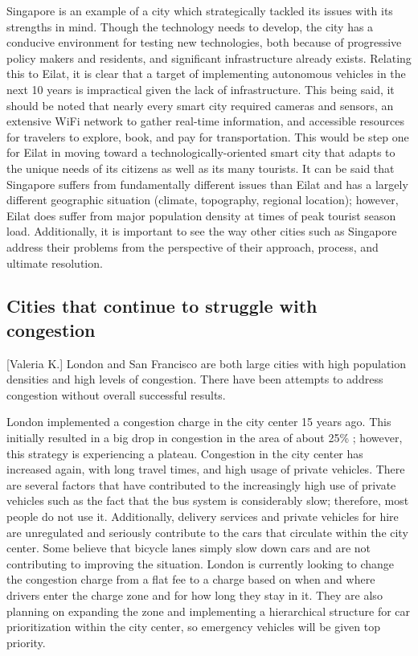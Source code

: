 \documentclass[12pt]{article}                       %
\begin{document}
Singapore is an example of a city which strategically tackled its issues with its strengths in mind. Though the technology needs to develop, the city has a conducive environment for testing new technologies, both because of progressive policy makers and residents, and significant infrastructure already exists. Relating this to Eilat, it is clear that a target of implementing autonomous vehicles in the next 10 years is impractical given the lack of infrastructure. This being said, it should be noted that nearly every smart city required cameras and sensors, an extensive WiFi network to gather real-time information, and accessible resources for travelers to explore, book, and pay for transportation. This would be step one for Eilat in moving toward a technologically-oriented smart city that adapts to the unique needs of its citizens as well as its many tourists. It can be said that Singapore suffers from fundamentally different issues than Eilat and has a largely different geographic situation (climate, topography, regional location); however, Eilat does suffer from major population density at times of peak tourist season load. Additionally, it is important to see the way other cities such as Singapore address their problems from the perspective of their approach, process, and ultimate resolution.

\subsection{Cities that continue to struggle with congestion}[Valeria K.]
London and San Francisco are both large cities with high population densities and high levels of congestion. There have been attempts to address congestion without overall successful results. 

London implemented a congestion charge in the city center 15 years ago. This initially resulted in a big drop in congestion in the area of about 25\% \cite{Badstuber2018LondonIt}; however, this strategy is experiencing a plateau. Congestion in the city center has increased again, with long travel times, and high usage of private vehicles. There are several factors that have contributed to the increasingly high use of private vehicles such as the fact that the bus system is considerably slow; therefore, most people do not use it. Additionally, delivery services and private vehicles for hire are unregulated and seriously contribute to the cars that circulate within the city center. Some believe that bicycle lanes simply slow down cars and are not contributing to improving the situation. London is currently looking to change the congestion charge from a flat fee to a charge based on when and where drivers enter the charge zone and for how long they stay in it. They are also planning on expanding the zone and implementing a hierarchical structure for car prioritization within the city center, so emergency vehicles will be given top priority. 
\end{document}
